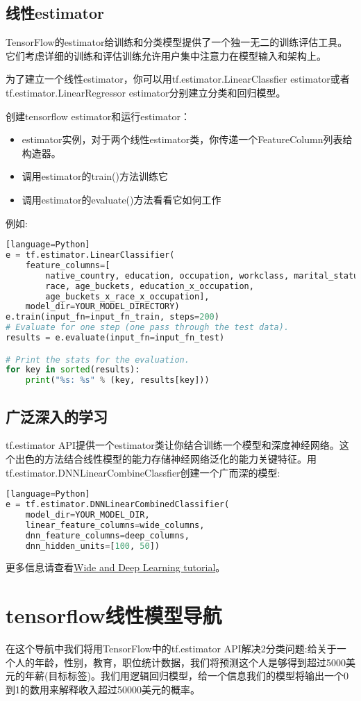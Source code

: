 \subsection{线性estimator}
TensorFlow的estimator给训练和分类模型提供了一个独一无二的训练评估工具。它们考虑详细的训练和评估训练允许用户集中注意力在模型输入和架构上。

为了建立一个线性estimator，你可以用tf.estimator.LinearClassfier estimator或者tf.estimator.LinearRegressor estimator分别建立分类和回归模型。

创建tensorflow estimator和运行estimator：
\begin{itemize}
  \item estimator实例，对于两个线性estimator类，你传递一个FeatureColumn列表给构造器。
  \item 调用estimator的train()方法训练它
  \item 调用estimator的evaluate()方法看看它如何工作
\end{itemize}
例如:
\begin{lstlisting}[language=Python][language=Python]
e = tf.estimator.LinearClassifier(
    feature_columns=[
        native_country, education, occupation, workclass, marital_status,
        race, age_buckets, education_x_occupation,
        age_buckets_x_race_x_occupation],
    model_dir=YOUR_MODEL_DIRECTORY)
e.train(input_fn=input_fn_train, steps=200)
# Evaluate for one step (one pass through the test data).
results = e.evaluate(input_fn=input_fn_test)

# Print the stats for the evaluation.
for key in sorted(results):
    print("%s: %s" % (key, results[key]))
\end{lstlisting}
\subsection{广泛深入的学习}
tf.estimator API提供一个estimator类让你结合训练一个模型和深度神经网络。这个出色的方法结合线性模型的能力存储神经网络泛化的能力关键特征。用tf.estimator.DNNLinearCombineClassfier创建一个广而深的模型:
\begin{lstlisting}[language=Python][language=Python]
e = tf.estimator.DNNLinearCombinedClassifier(
    model_dir=YOUR_MODEL_DIR,
    linear_feature_columns=wide_columns,
    dnn_feature_columns=deep_columns,
    dnn_hidden_units=[100, 50])
\end{lstlisting}
更多信息请查看\href{https://www.tensorflow.org/tutorials/wide_and_deep}{Wide and Deep Learning tutorial}。
\section{tensorflow线性模型导航}
在这个导航中我们将用TensorFlow中的tf.estimator API解决2分类问题:给关于一个人的年龄，性别，教育，职位统计数据，我们将预测这个人是够得到超过5000美元的年薪(目标标签)。我们用逻辑回归模型，给一个信息我们的模型将输出一个0到1的数用来解释收入超过50000美元的概率。
